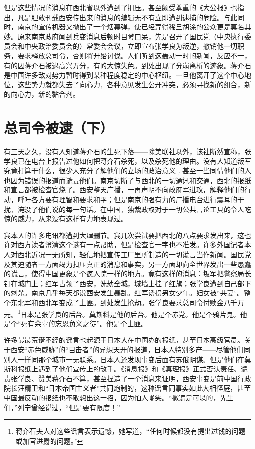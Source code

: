 \documentclass[10pt]{book}
\begin{document}
但是这些情况的消息在西北省以外遭到了扣压。甚至颇受尊重的《大公报》也指出，凡是胆敢刊载西安传出来的消息的编辑无不有立即遭到逮捕的危险。与此同时，南京的宣传机器又抛出了一个烟幕弹，使已经弄得稀里胡涂的公众更是莫名其妙。原来南京政府闻到兵变消息后顿时目瞪口呆，先是召开了国民党（中央执行委员会和中央政治委员会的）常委会会议，立即宣布张学良为叛逆，撤销他一切职务，要求释放总司令，否则将开始讨伐。人们听到这轰动一时的新闻，反应不一，有的因蒋介石被逮高兴万分，有的大惊失色。到处出现了分崩离析的迹象。蒋介石是中国许多敌对势力暂时得到某种程度稳定的中心枢纽。一旦他离开了这个中心地位，这些势力就都失去了向心力，各种意见发生公开冲突，必须寻找新的组合，新的向心力，新的黏合剂。



\section{总司令被逮（下）}

有三天之久，没有人知道蒋介石的生死下落——除美联社以外，该社断然宣称，张学良已在电台上报告过他如何把蒋介石杀死，以及杀死他的理由。没有人知道叛军究竟打算干什么，很少人充分了解他们的立场的政治意义；甚至一些同情他们的人也因为错误的报道而谴责他们。南京切断了与西北的一切通讯和交通，西北的报纸和宣言都被检查官烧了。西安整天广播，一再声明不向政府军进攻，解释他们的行动，呼吁各方要有理智和要求和平；但是南京的强有力的广播电台进行震耳的干扰，淹没了他们说的每一句话。在中国，独裁政权对于一切公共言论工具的令人吃惊的威力，从来没有这样有力地表现过。

我本人的许多电讯都遭到大肆删节。我几次尝试要把西北的八点要求发出来，这也许对西方读者澄清这个谜有一点帮助，但是检查官一字也不准发。许多外国记者本人对西北近况一无所知，轻信地把宣传工厂里所制造的一切谎言当作新闻。国民党及其追随者一方面竭力扣压真正的消息和事实，另一方面却向全世界发出一些愚蠢的谎言，使得中国更象是个疯人院一样的地方。竟有这样的消息：叛军把警察局长钉在城门上；红军占领了西安，洗劫全城，城墙上挂了红旗；张学良遭到自己部下的刺杀。南京几乎每天都说西安发生暴乱。红军诱拐男女少年。妇女被“共妻”。整个东北军和西北军变成了土匪。到处发生抢劫。张学良要求总司令付赎金八千万元。\footnote{蒋介石夫人对这些谣言表示遗憾，她写道，“任何时候都没有提出过钱的问题或加官进爵的问题。”}日本是张学良的后台。莫斯科是他的后台。他是个赤党。他是个鸦片鬼。他是个“死有余辜的忘恩负义之徒”。他是个土匪。

许多最最荒诞不经的谣言也起源于日本人在中国办的报纸，甚至日本高级官员。关于西安“赤色威胁”的“目击者”的异想天开的报道，日本人特别多产——尽管他们同别人一样同那个城市一无联系。日本人还发现事变后面有苏俄阴谋。但是他们在莫斯科报纸上遇到了他们宣传上的敌手。《消息报》和《真理报》正式否认责任、谴责张学良、赞美蒋介石不算，甚至捏造了一个消息来证明，西安事变是前中国行政院长汪精卫和“日本帝国主义者”共同炮制的，这种谣言同事实如此大相径庭，甚至中国最反动的报纸也不敢想出这一招，因为怕人嘲笑。“撒谎是可以的，先生们，”列宁曾经说过，“但是要有限度！”
\end{document}
